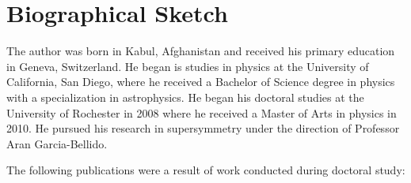 \section*{Biographical Sketch}
The author was born in Kabul, Afghanistan and received his primary 
education in Geneva, Switzerland. He began is studies in physics at 
the University of California, San Diego, where he received a Bachelor 
of Science degree in physics with a specialization in astrophysics.   
He began his doctoral studies at the University of Rochester 
in 2008 where he received a Master of Arts in physics in 2010. 
He pursued his research in supersymmetry under the direction 
of Professor Aran Garcia-Bellido.

The following publications were a result of work conducted during doctoral study:
\begingroup
\renewcommand\refname{}%

\endgroup
